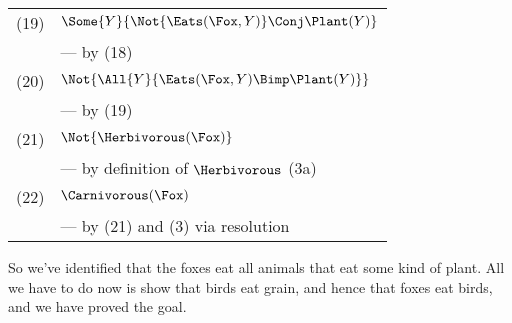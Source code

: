 \begin{itemize}
\begin{tabular}{rl}
(19) & $\Some{Y}{\Not{\Eats(\Fox, Y)} \Conj \Plant(Y)}$
\\ & --- by (18) \\
(20) & $\Not{\All{Y}{\Eats(\Fox, Y) \Bimp \Plant(Y)}}$
\\ & --- by (19) \\
(21) & $\Not{\Herbivorous(\Fox)}$
\\ & --- by definition of $\Herbivorous$ (3a) \\
(22) & $\Carnivorous(\Fox)$
\\ & --- by (21) and (3) via resolution \\
\end{tabular}
So we've identified that the foxes eat all animals that eat some kind of
plant.  All we have to do now is show that birds eat grain, and hence
that foxes eat birds, and we have proved the goal.


\end{itemize}

